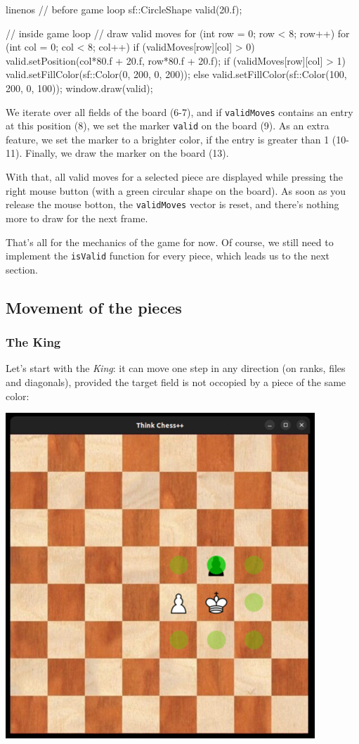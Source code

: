 \begin{cpp*}{linenos}
  // before game loop
  sf::CircleShape valid(20.f);

    // inside game loop
    // draw valid moves
    for (int row = 0; row < 8; row++) {
      for (int col = 0; col < 8; col++) {
        if (validMoves[row][col] > 0) {
          valid.setPosition(col*80.f + 20.f, row*80.f + 20.f);
          if (validMoves[row][col] > 1)
            valid.setFillColor(sf::Color(0, 200, 0, 200));
          else valid.setFillColor(sf::Color(100, 200, 0, 100));
          window.draw(valid);
        }
      }
    }
\end{cpp*}

We iterate over all fields of the board (6-7), and if \texttt{validMoves} contains
an entry at this position (8), we set the marker \texttt{valid} on the board (9).
As an extra feature, we set the marker to a brighter color, if the entry is greater than 1
(10-11).
Finally, we draw the marker on the board (13).

With that, all valid moves for a selected piece are displayed while pressing the right mouse button
(with a green circular shape on the board). As soon as you release the mouse botton, the
\texttt{validMoves} vector is reset, and there's nothing more to draw for the next frame.

That's all for the mechanics of the game for now. Of course, we still need to implement the
\texttt{isValid} function for every piece, which leads us to the next section.

\subsection{Movement of the pieces}\label{subsec:validmoves}
\subsubsection{The King}

Let's start with the \emph{King}: it can move one step in any direction (on ranks, files and
diagonals), provided the target field is not occopied by a piece of the same color:

\begin{center}
\includegraphics[width=.5\linewidth]{../img/king.jpg}
\end{center}

